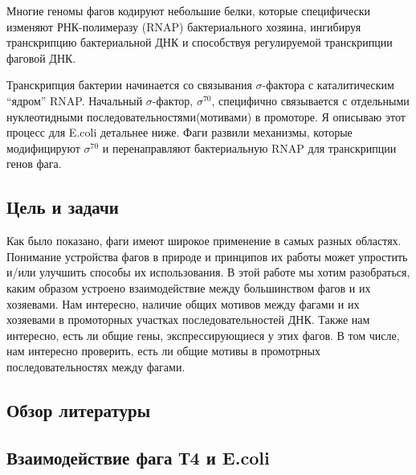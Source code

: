 \documentclass[14pt]{extarticle}
\begin{document}
    \par{Многие геномы фагов кодируют небольшие белки, которые специфически изменяют РНК-полимеразу (RNAP)
    бактериального хозяина, ингибируя транскрипцию бактериальной ДНК и способствуя регулируемой транскрипции фаговой 
    ДНК. \cite{phagetrans}}    
    
    \par{Транскрипция бактерии начинается со связывания $\sigma$-фактора с каталитическим ``ядром'' RNAP. Начальный 
    $\sigma$-фактор, $\sigma^{70}$, специфично связывается с отдельными нуклеотидными последовательностями(мотивами) в 
    промоторе. Я описываю этот процесс для E.coli детальнее ниже. Фаги развили механизмы, которые модифицируют 
    $\sigma^{70}$ и перенаправляют бактериальную RNAP для транскрипции генов фага.}
    
\newpage
\begin{center}
\item \section{Цель и задачи} \label{sec:code}
\end{center}

    \par{Как было показано, фаги имеют широкое применение в самых разных областях. Понимание устройства фагов в природе и принципов их работы может упростить и/или улучшить способы их использования. В этой работе мы хотим разобраться, каким образом устроено взаимодействие между большинством фагов и их хозяевами. Нам интересно, наличие общих мотивов между фагами и их хозяевами в промоторных участках последовательностей ДНК. Также нам интересно, есть ли общие гены, экспрессирующиеся у этих фагов. В том числе, нам интересно проверить, есть ли общие мотивы в промотрных последовательностях между фагами.}

\newpage
\begin{center}
\item \section{Обзор литературы} \label{sec:math}
\item \subsection{Взаимодействие фага Т4 и E.coli}
\end{center}
        
\end{document}
